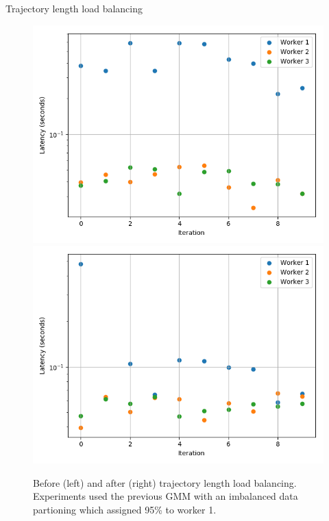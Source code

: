 \documentclass[final]{beamer}
\newlength{\onecolwid}
\newlength{\twocolwid}
\begin{document}
\begin{frame}[t]
\begin{columns}[t]
\begin{column}{\twocolwid}
\begin{columns}[t,totalwidth=\twocolwid]
\begin{column}{\onecolwid}
\begin{block}{Trajectory length load balancing}

  \begin{figure}
    \includegraphics[width=0.8\linewidth]{poster-figures/load-balancing-none.png}\\
    \includegraphics[width=0.8\linewidth]{poster-figures/load-balancing.png}
    \caption{Before (left) and after (right) trajectory length load balancing. Experiments used
      the previous GMM with an imbalanced data partioning which assigned 95\% to worker 1.}
    \label{fig:load-balancing}
  \end{figure}


\end{block}
\end{column}
\end{columns}
\end{column}
\end{columns}
\end{frame}
\end{document}
